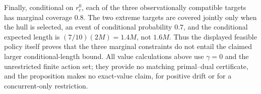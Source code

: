 Finally, conditional on \(r_c^0\), each of the three observationally compatible targets has marginal coverage \(0.8\).  The two extreme targets are covered jointly only when the hull is selected, an event of conditional probability \(0.7\), and the conditional expected length is \((7/10)(2M)=1.4M\), not \(1.6M\).  Thus the displayed feasible policy itself proves that the three marginal constraints do not entail the claimed larger conditional-length bound.  All value calculations above use \(\gamma=0\) and the unrestricted finite action set; they provide no matching primal--dual certificate, and the proposition makes no exact-value claim, for positive drift or for a concurrent-only restriction.
